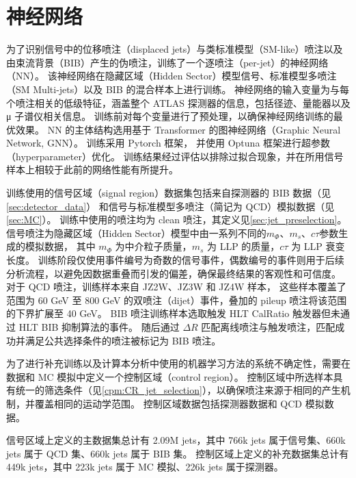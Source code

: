 
\chapter{神经网络}
\label{chap:NN}

为了识别信号中的位移喷注（displaced jets）与类标准模型（SM-like）喷注以及由束流背景（BIB）产生的伪喷注，训练了一个逐喷注（per-jet）的神经网络（NN）。
该神经网络在隐藏区域（Hidden Sector）模型信号、标准模型多喷注（SM Multi-jets）以及 BIB 的混合样本上进行训练。
神经网络的输入变量为与每个喷注相关的低级特征，涵盖整个 ATLAS 探测器的信息，包括径迹、量能器以及 μ 子谱仪相关信息。
训练前对每个变量进行了预处理，以确保神经网络训练的最优效果。
NN 的主体结构选用基于 Transformer\cite{vaswani2023attentionneed} 的图神经网络（Graphic Neural Network, GNN）。
训练采用 Pytorch\cite{paszke2019pytorchimperativestylehighperformance} 框架，
并使用 Optuna\cite{akiba2019optunanextgenerationhyperparameteroptimization} 框架进行超参数（hyperparameter）优化。
训练结果经过评估以排除过拟合现象，并在所用信号样本上相较于此前的网络性能有所提升。

训练使用的信号区域（signal region）数据集包括来自探测器的 BIB 数据（见\autoref{sec:detector_data}）
和信号与标准模型多喷注（简记为 QCD）模拟数据（见\autoref{sec:MC}）。
训练中使用的喷注均为 clean 喷注，其定义见\autoref{sec:jet_preselection}。
信号喷注为隐藏区域（Hidden Sector）模型中由一系列不同的$m_\Phi$、$m_s$、$c\tau$参数生成的模拟数据，
其中 $m_\Phi$ 为中介粒子质量，$m_s$ 为 LLP 的质量，$c\tau$ 为 LLP 衰变长度。
训练阶段仅使用事件编号为奇数的信号事件，偶数编号的事件则用于后续分析流程，以避免因数据重叠而引发的偏差，确保最终结果的客观性和可信度。
对于 QCD 喷注，训练样本来自 JZ2W、JZ3W 和 JZ4W 样本，
这些样本覆盖了 \pt 范围为 60 GeV 至 800 GeV 的双喷注（dijet）事件，叠加的 pileup 喷注将该范围的下界扩展至 40 GeV。
BIB 喷注训练样本选取触发 HLT CalRatio 触发器但未通过 HLT BIB 抑制算法的事件。
随后通过 $\Delta R$ 匹配离线喷注与触发喷注，匹配成功并满足公共选择条件的喷注被标记为 BIB 喷注。

为了进行补充训练以及计算本分析中使用的机器学习方法的系统不确定性，需要在数据和 MC 模拟中定义一个控制区域（control region）。
控制区域中所选样本具有统一的筛选条件（见\autoref{cpm:CR_jet_selection}），以确保喷注来源于相同的产生机制，并覆盖相同的运动学范围。
控制区域数据包括探测器数据和 QCD 模拟数据。

信号区域上定义的主数据集总计有 2.09M jets，其中 766k jets 属于信号集、660k jets 属于 QCD 集、660k jets 属于 BIB 集。
控制区域上定义的补充数据集总计有 449k jets，其中 223k jets 属于 MC 模拟、226k jets 属于探测器。

